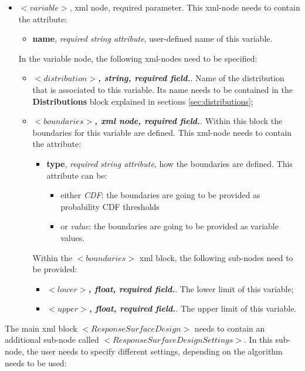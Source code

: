\begin{itemize}
\item $<variable>$, xml node, required parameter. This xml-node needs to contain the attribute:
\begin{itemize}
  \item \textbf{name}, \textit{required string attribute}, user-defined name of this variable. 
\end{itemize}
 In the variable node, the following xml-nodes need to be specified:
 \begin{itemize}
    \item $<distribution>$\textbf{\textit{, string, required field.}}. Name of the distribution that is associated to this variable. Its name needs to be contained in the \textbf{Distributions} block explained in sections \ref{sec:distributions};
     \item $<boundaries>$\textbf{\textit{, xml node, required field.}}. Within this block the boundaries for this variable are defined. This xml-node needs to contain the attribute:
\begin{itemize}
  \item \textbf{type}, \textit{required string attribute}, how the boundaries are defined. This attribute can be:
    \begin{itemize}
      \item either  \textit{CDF}: the boundaries are going to be provided as probability CDF thresholds
      \item or  \textit{value}: the boundaries are going to be provided as variable values.
    \end{itemize}
\end{itemize}
    Within the $<boundaries>$ xml block, the following sub-nodes need to be provided:
     \begin{itemize}
      \item $<lower>$\textbf{\textit{, float, required field.}}. The lower limit of this variable;
      \item $<upper>$\textbf{\textit{, float, required field.}}. The upper limit of this variable. 
    \end{itemize}   
  \end{itemize}
\end{itemize}
The main xml block $<ResponseSurfaceDesign>$ needs to contain an additional sub-node called $<ResponseSurfaceDesignSettings>$. In this sub-node, the user needs to specify different settings, depending on the algorithm needs to be used:
